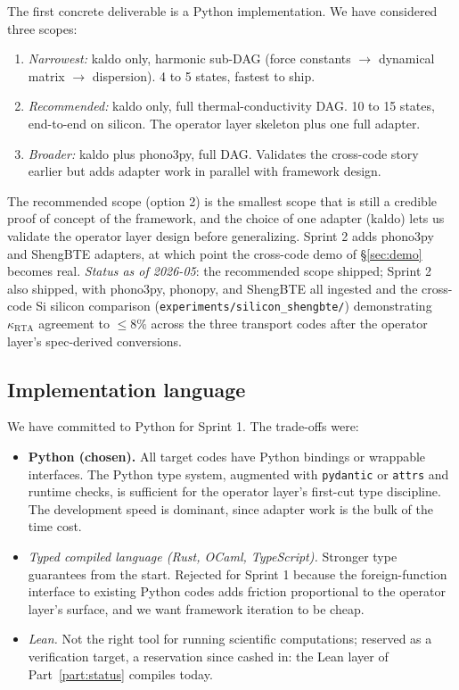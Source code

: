 \documentclass[11pt,a4paper]{article}
\begin{document}
The first concrete deliverable is a Python implementation. We have considered three scopes:

\begin{enumerate}[leftmargin=2em]
  \item \emph{Narrowest:} kaldo only, harmonic sub-DAG (force constants $\to$ dynamical matrix
        $\to$ dispersion). 4 to 5 states, fastest to ship.
  \item \emph{Recommended:} kaldo only, full thermal-conductivity DAG. 10 to 15 states, end-to-end
        on silicon. The operator layer skeleton plus one full adapter.
  \item \emph{Broader:} kaldo plus phono3py, full DAG. Validates the cross-code story earlier but
        adds adapter work in parallel with framework design.
\end{enumerate}

The recommended scope (option 2) is the smallest scope that is still a credible proof of concept
of the framework, and the choice of one adapter (kaldo) lets us validate the operator layer design
before generalizing. Sprint 2 adds phono3py and ShengBTE adapters, at which point the cross-code
demo of \S\ref{sec:demo} becomes real. \emph{Status as of 2026-05}: the
recommended scope shipped; Sprint 2 also shipped, with phono3py, phonopy,
and ShengBTE all ingested and the cross-code Si silicon comparison
(\texttt{experiments/silicon\_shengbte/}) demonstrating $\kappa_\text{RTA}$
agreement to $\le 8\%$ across the three transport codes after the operator
layer's spec-derived conversions.

\subsection{Implementation language}

We have committed to Python for Sprint 1. The trade-offs were:

\begin{itemize}[leftmargin=2em]
  \item \textbf{Python (chosen).} All target codes have Python bindings or wrappable interfaces.
        The Python type system, augmented with \texttt{pydantic} or \texttt{attrs} and runtime
        checks, is sufficient for the operator layer's first-cut type discipline. The development
        speed is dominant, since adapter work is the bulk of the time cost.
  \item \emph{Typed compiled language (Rust, OCaml, TypeScript).} Stronger type guarantees from
        the start. Rejected for Sprint 1 because the foreign-function interface to existing
        Python codes adds friction proportional to the operator layer's surface, and we want
        framework iteration to be cheap.
  \item \emph{Lean.} Not the right tool for running scientific computations;
        reserved as a verification target, a reservation since cashed in: the
        Lean layer of Part~\ref{part:status} compiles today.
\end{itemize}
\end{document}
